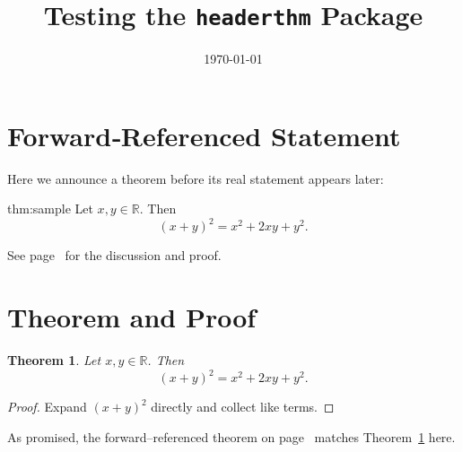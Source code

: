 \documentclass{article}
\newtheorem{theorem}{Theorem}[section]
\begin{document}
\title{Testing the \texttt{headerthm} Package}
\author{}
\date{\today}
\maketitle

\section*{Forward‐Referenced Statement}

Here we announce a theorem before its real statement appears later:

\begin{headerthm}{thm:sample} \label{header-reference}
  Let \(x,y\in\mathbb{R}\). Then
  \[
    (x+y)^2 = x^2 + 2xy + y^2.
  \]
\end{headerthm}

\bigskip
See page~\pageref{thm:sample} for the discussion and proof.

\newpage

\section{Theorem and Proof}

\begin{theorem}\label{thm:sample}
  Let \(x,y\in\mathbb{R}\). Then
  \[
    (x+y)^2 = x^2 + 2xy + y^2.
  \]
\end{theorem}
\begin{proof}
  Expand \((x+y)^2\) directly and collect like terms.
\end{proof}

As promised, the forward–referenced theorem on page~\pageref{header-reference} matches Theorem~\ref{thm:sample} here.
\end{document}
